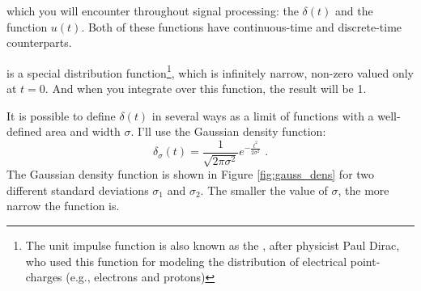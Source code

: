 %
% 
%
 which you will encounter throughout signal processing: the \emph{} $\delta(t)$ and the \emph{} function $u(t)$. Both of these functions have continuous-time and discrete-time counterparts.

 is a special distribution function\footnote{The unit impulse function is also known as the \emph{}, after physicist Paul Dirac, who used this function for modeling the distribution of electrical point-charges (e.g., electrons and protons)}, which is infinitely narrow, non-zero valued only at $t=0$. And when you integrate over this function, the result will be 1.

It is possible to define $\delta(t)$ in several ways as a limit of functions with a well-defined area and width $\sigma$. 
I'll use the Gaussian density function:
\begin{equation}
\delta_\sigma(t) = \frac{1}{\sqrt{2\pi \sigma^2}}e^{-\frac{t^2}{2\sigma^2}}\,\,.
\end{equation}
The Gaussian density function is shown in Figure \ref{fig:gauss_dens} for two different standard deviations $\sigma_1$ and $\sigma_2$. The smaller the value of $\sigma$, the more narrow the function is.


